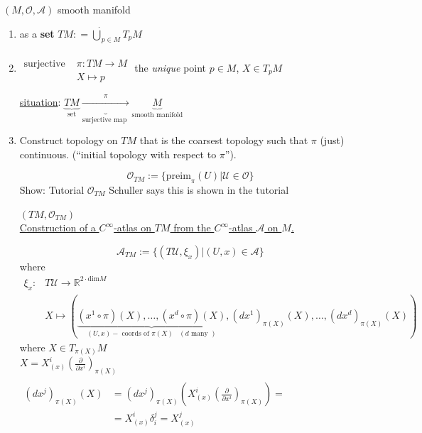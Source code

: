 	$(M,\mathcal{O},\mathcal{A})$ smooth manifold
	
	\begin{enumerate}
		\item[(a)] as a \textbf{set}
		$TM : = \dot{\bigcup}_{p\in M} T_pM$
		\item[(b)] $\begin{aligned} & \quad \\
		\text{surjective } & \pi: TM \to M \\
		& X\mapsto p \end{aligned}$ the \emph{unique} point $p\in M$, $X \in T_pM$  
		
		\underline{situation}:  $\underbrace{TM}_{\text{set}} \underbrace{ \xrightarrow{ \pi } }_{\text{surjective map }} \underbrace{M}_{\text{smooth manifold}}$
		
		\item[(c)] Construct topology on $TM$ that is the coarsest topology such that $\pi$ (just) continuous.  (``initial topology with respect to $\pi$'').
		
		\[
		\mathcal{O}_{TM} := \lbrace \text{preim}_{\pi}(U) | \mathcal{U}\in \mathcal{O} \rbrace
		\]
		Show: Tutorial $\mathcal{O}_{TM}$
		Schuller says this is shown in the tutorial
		
		$(TM,\mathcal{O}_{TM})$  \\
		
		\underline{Construction of a $C^{\infty}$-atlas on $TM$ from the $C^{\infty}$-atlas $\mathcal{A}$ on $M$. }
		
		\[
		\mathcal{A}_{TM} := \lbrace (T\mathcal{U},\xi_x  ) | (U,x) \in \mathcal{A} \rbrace
		\]
		where
		\[
		\begin{aligned}
		\xi_x : & T \mathcal{U} \to \mathbb{R}^{2\cdot\text{dim}  M } \\
		& X \mapsto (\underbrace{ (x^1 \circ \pi)(X), \dots, (x^d\circ \pi)(X) }_{(U,x)-\text{ coords of $\pi(X)$ } \, (d \text{ many } ) } , (dx^1)_{\pi(X)}(X), \dots , (dx^d)_{\pi(X)}(X)  )
		\end{aligned}
		\]
		where $X\in T_{\pi(X)}M$ \\
		\phantom{where } $X = X_{(x)}^i \left( \frac{ \partial }{ \partial x^i} \right)_{\pi(X)}$  \\
		\phantom{where } $\begin{aligned} \quad  & \\
		(dx^j)_{\pi(X)}(X) &= (dx^j)_{\pi(X)} \left( X^i_{(x)}\left( \frac{ \partial }{ \partial x^i} \right)_{\pi(X)} \right) = \\
		& = X^i_{(x)}\delta_i^j = X^j_{(x)}\end{aligned}$
		

\end{enumerate}
